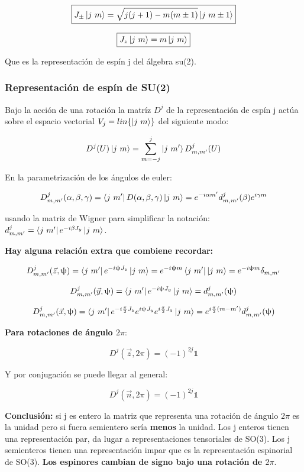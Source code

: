 $$\boxed{J_\pm \ket{j \ m}=\sqrt{j(j+1)-m(m \pm 1)}\ket{ j \ m \pm 1}}$$

$$\boxed{J_z \ket{j \ m} =m \ket{ j \ m}}$$

Que es la representación de espín j del álgebra su(2).

\subsubsection{Representación de espín de SU(2)}

Bajo la acción de una rotación la matríz $D^j$ de la representación de espín j actúa sobre el espacio vectorial $V_j=lin \lbrace \ket{ j \ m } \rbrace$ del siguiente modo:

$$D^j(U)\ket{j \ m} = \sum _{m=-j}^j \ket{j \ m '}D^j_{m,m'}(U)$$

En la parametrización de los ángulos de euler:

$$D^j_{m,m'}(\alpha , \beta , \gamma)= \bra{j \ m'} D(\alpha , \beta , \gamma ) \ket{j \ m} = e^{-i\alpha m'}d^{j}_{m,m'}(\beta) e^{i\gamma m}$$

usando la matriz de Wigner para simplificar la notación: $d^j_{m,m'}=\bra{j \ m'} e^{-i\beta J_y} \ket{j \ m}$.

\textbf{ Hay alguna relación extra que combiene recordar:}

$$D^j_{m,m'}(\Vec{z},\uppsi)= \bra{j \ m'} e^{-i\uppsi J_z} \ket{j \ m}=e^{-i\uppsi m} \bra{j \ m'} \ket{j \ m}=e^{-i\uppsi m} \delta _{m,m'}$$

$$D^j_{m,m'}(\Vec{y},  \uppsi
) = \bra{j \ m'} e^{-i\uppsi J_y} \ket{j \ m} = d^j_{m,m'}(\uppsi)$$

$$D^j_{m,m'}(\Vec{x},\uppsi)= \bra{j \ m'} e^{-i\frac{\pi}{2} J_z}e^{i\uppsi J_y} e^{i\frac{\pi}{2}J_z} \ket{j \ m}=e^{i\frac{\pi}{2}(m-m')}d^j_{m,m'}(\uppsi)$$

\smallskip

\textbf{Para rotaciones de ángulo $2 \pi$}:

$$D^j(\Vec{z},2\pi)= (-1)^{2j} \mathds{1}$$

\smallskip
Y por conjugación se puede llegar al general:

$$D^j(\Vec{n},2\pi)=(-1)^{2j}\mathds{1}$$

\textbf{Conclusión:} si j es entero la matriz que representa una rotación de ángulo $2\pi$ es la unidad pero si fuera semientero sería \textbf{menos} la unidad. Los j enteros tienen una representación par, da lugar a representaciones tensoriales de SO(3). Los j semienteros tienen una representación impar que es la representación espinorial de SO(3). \textbf{Los espinores cambian de signo bajo una rotación de $2\pi$}.


